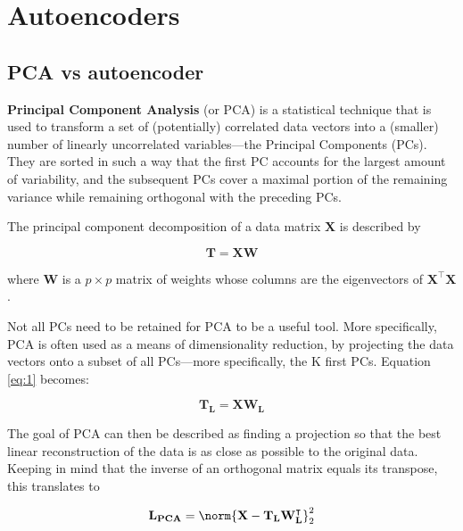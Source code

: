 

\section{Autoencoders}
\label{sec:auto}




\subsection{PCA vs autoencoder}

\textbf{Principal Component Analysis} (or PCA) is a statistical technique that is used to transform a set of (potentially) correlated data vectors into a (smaller) number of linearly uncorrelated variables---the Principal Components (PCs). They are sorted in such a way that the first PC accounts for the largest amount of variability, and the subsequent PCs cover a maximal portion of the remaining variance while remaining orthogonal with the preceding PCs.

The principal component decomposition of a data matrix $\mathbf{X}$ is described by

\begin{equation} \label{eq:1}
	\mathbf{T} = \mathbf{XW}
\end{equation}

where $\mathbf{W}$ is a $p \times p$ matrix of weights whose columns are the eigenvectors of $\mathbf{X^ \intercal X}$. 

Not all PCs need to be retained for PCA to be a useful tool. More specifically, PCA is often used as a means of dimensionality reduction, by projecting the data vectors onto a subset of all PCs---more specifically, the K first PCs. Equation \ref{eq:1} becomes:

\begin{equation} \label{eq:2}
	\mathbf{T_L} = \mathbf{XW_L}
\end{equation}

The goal of PCA can then be described as finding a projection so that the best linear reconstruction of the data is as close as possible to the original data. Keeping in mind that the inverse of an orthogonal matrix equals its transpose, this translates to

\begin{equation} \label{eq:3}
	\mathbf{L_{PCA}} = \norm{\mathbf{X} - \mathbf{T_L W ^\intercal_L  }}_2^2
\end{equation}


